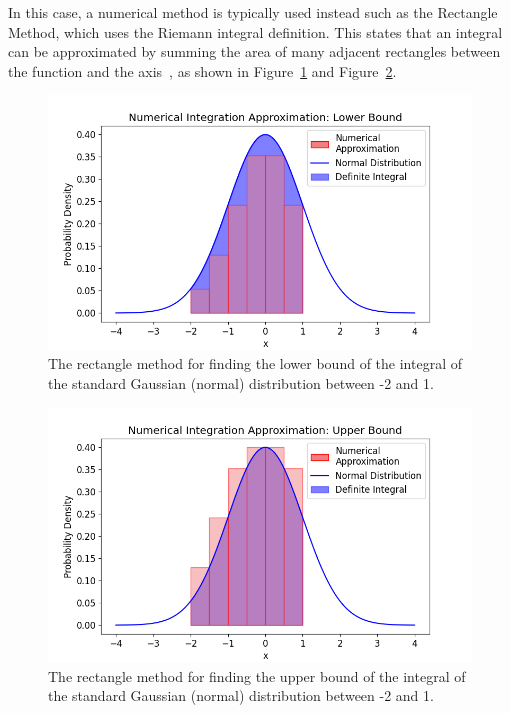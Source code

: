 \documentclass[12pt]{article}
\newcommand{\ndiFigCaption}[1]{The rectangle method for finding the #1 bound of the integral of the standard Gaussian (normal) distribution between -2 and 1.}
\begin{document}
    In this case, a numerical method is typically used instead such as the Rectangle Method, which uses the Riemann integral definition.
    This states that an integral can be approximated by summing the area of many adjacent rectangles between the function and the axis~\cite{NumericalAnalysis2023}, as shown in Figure~\ref{fig:ndi-num_} and Figure~\ref{fig:ndi-num2_}.

    \FloatBarrier

    \begin{figure}[htbp]
        \centering
        \includegraphics[width=0.8\linewidth]{figures/ndi-num/ndi-num_}
        \caption{\ndiFigCaption{lower}}
        \label{fig:ndi-num_}
    \end{figure}

    \FloatBarrier

    \begin{figure}[htbp]
        \centering
        \includegraphics[width=0.8\linewidth]{figures/ndi-num2/ndi-num2_}
        \caption{\ndiFigCaption{upper}}
        \label{fig:ndi-num2_}
    \end{figure}
\end{document}
